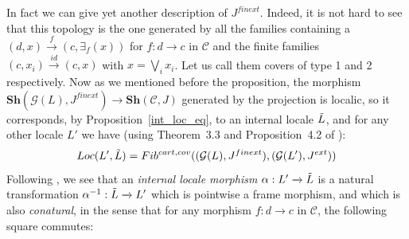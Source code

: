 \documentclass{article}
\begin{document}
In fact we can give yet another description of $J^{finext}$. Indeed, it is not hard to see that this topology is the one generated by all the families containing a $(d,x)\xrightarrow{f}(c,\exists_f(x))$ for $f:d\xrightarrow{}c$ in $\mathcal{C}$ and the finite families $(c,x_i)\xrightarrow{id}(c,x)$ with $x=\bigvee_i x_i$. Let us call them covers of type 1 and 2 respectively. Now as we mentioned before the proposition, the morphism $\mathbf{Sh}(\mathcal{G}(L),J^{finext})\xrightarrow{}\mathbf{Sh}(\mathcal{C},J)$ generated by the projection is localic, so it corresponds, by Proposition~\ref{int_loc_eq}, to an internal locale $\Tilde{L}$, and for any other locale $L'$ we have (using Theorem~3.3 and Proposition~4.2 of \cite{caramello2022fibred}):
$$Loc(L',\Tilde{L})=Fib^{cart,cov}((\mathcal{G}(L),J^{finext}),(\mathcal{G}(L'),J^{ext}))$$
Following \cite{wrigley2023some}, we see that an \emph{internal locale morphism} $\alpha:L'\xrightarrow{}\Tilde{L}$ is a natural transformation $\alpha^{-1}:\Tilde{L}\xrightarrow{}L'$ which is pointwise a frame morphism, and which is also \emph{conatural}, in the sense that for any morphism $f:d\xrightarrow{}c$ in $\mathcal{C}$, the following square commutes:
\begin{center}
    \end{center}
\end{document}

